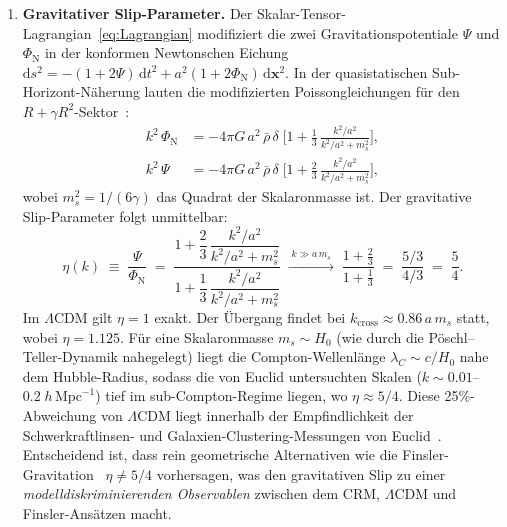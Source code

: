 \documentclass[12pt,a4paper]{article}
\theoremstyle{definition}
\theoremstyle{plain}
\theoremstyle{remark}
\begin{document}
\begin{enumerate}
  \item \textbf{Gravitativer Slip-Parameter.}\;
        Der Skalar-Tensor-Lagrangian~\eqref{eq:Lagrangian} modifiziert die
        zwei Gravitationspotentiale $\Psi$ und $\Phi_{\mathrm{N}}$ in der
        konformen Newtonschen Eichung
        $\mathrm{d}s^{2} = -(1+2\Psi)\,\mathrm{d}t^{2}
        + a^{2}(1+2\Phi_{\mathrm{N}})\,\mathrm{d}\mathbf{x}^{2}$.
        In der quasistatischen Sub-Horizont-N\"aherung lauten die
        modifizierten Poissongleichungen f\"ur den
        $R + \gamma R^{2}$-Sektor~\cite{HuSawicki2007,SotiriouFaraoni2010}:
        \begin{align}
          k^{2}\,\Phi_{\mathrm{N}} &= -4\pi G\,a^{2}\,\bar{\rho}\,\delta
          \;\biggl[1 + \frac{1}{3}\,
          \frac{k^{2}/a^{2}}{k^{2}/a^{2} + m_{s}^{2}}\biggr],
          \label{eq:Poisson-Phi}\\[4pt]
          k^{2}\,\Psi &= -4\pi G\,a^{2}\,\bar{\rho}\,\delta
          \;\biggl[1 + \frac{2}{3}\,
          \frac{k^{2}/a^{2}}{k^{2}/a^{2} + m_{s}^{2}}\biggr],
          \label{eq:Poisson-Psi}
        \end{align}
        wobei $m_{s}^{2} = 1/(6\gamma)$ das Quadrat der Skalaronmasse ist.
        Der gravitative Slip-Parameter folgt unmittelbar:
        \begin{equation}\label{eq:grav-slip}
          \eta(k) \;\equiv\; \frac{\Psi}{\Phi_{\mathrm{N}}}
          \;=\;
          \frac{1 + \dfrac{2}{3}\,
          \dfrac{k^{2}/a^{2}}{k^{2}/a^{2} + m_{s}^{2}}}
          {1 + \dfrac{1}{3}\,
          \dfrac{k^{2}/a^{2}}{k^{2}/a^{2} + m_{s}^{2}}}
          \;\xrightarrow{\;k \gg a\,m_{s}\;}
          \;\frac{1 + \tfrac{2}{3}}{1 + \tfrac{1}{3}}
          \;=\; \frac{5/3}{4/3}
          \;=\; \frac{5}{4}.
        \end{equation}
        Im $\Lambda$CDM gilt $\eta = 1$ exakt. Der \"Ubergang findet bei
        $k_{\mathrm{cross}} \approx 0.86\,a\,m_{s}$ statt, wobei
        $\eta = 1.125$. F\"ur eine Skalaronmasse $m_{s} \sim H_{0}$
        (wie durch die P\"oschl--Teller-Dynamik nahegelegt) liegt die
        Compton-Wellenl\"ange $\lambda_{C} \sim c/H_{0}$ nahe dem
        Hubble-Radius, sodass die von Euclid untersuchten Skalen
        ($k \sim 0.01$--$0.2\;h\,\mathrm{Mpc}^{-1}$) tief im
        sub-Compton-Regime liegen, wo $\eta \approx 5/4$. Diese
        25\%-Abweichung von $\Lambda$CDM liegt innerhalb der
        Empfindlichkeit der Schwerkraftlinsen- und
        Galaxien-Clustering-Messungen von
        Euclid~\cite{HuSawicki2007}. Entscheidend ist, dass rein
        geometrische Alternativen wie die
        Finsler-Gravitation~\cite{FinslerJCAP2025}
        $\eta \neq 5/4$ vorhersagen, was den gravitativen Slip zu
        einer \emph{modelldiskriminierenden Observablen} zwischen dem
        CRM, $\Lambda$CDM und Finsler-Ans\"atzen macht.


\end{enumerate}
\end{document}
